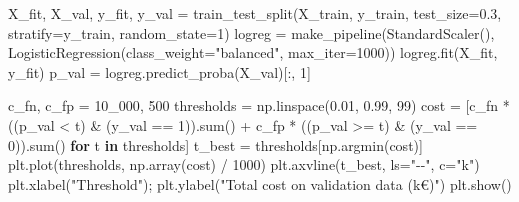 \documentclass[
  letterpaper,
  DIV=11,
  numbers=noendperiod]{scrreprt}
\newenvironment{Shaded}{\begin{snugshade}}{\end{snugshade}}
\newcommand{\BuiltInTok}[1]{\textcolor[rgb]{0.00,0.23,0.31}{#1}}
\newcommand{\ControlFlowTok}[1]{\textcolor[rgb]{0.00,0.23,0.31}{\textbf{#1}}}
\newcommand{\DecValTok}[1]{\textcolor[rgb]{0.68,0.00,0.00}{#1}}
\newcommand{\FloatTok}[1]{\textcolor[rgb]{0.68,0.00,0.00}{#1}}
\newcommand{\KeywordTok}[1]{\textcolor[rgb]{0.00,0.23,0.31}{\textbf{#1}}}
\newcommand{\NormalTok}[1]{\textcolor[rgb]{0.00,0.23,0.31}{#1}}
\newcommand{\OperatorTok}[1]{\textcolor[rgb]{0.37,0.37,0.37}{#1}}
\newcommand{\StringTok}[1]{\textcolor[rgb]{0.13,0.47,0.30}{#1}}
\begin{document}
\begin{tcolorbox}[enhanced jigsaw, left=2mm, title=\textcolor{quarto-callout-caution-color}{\faFire}\hspace{0.5em}{Solution to Exercise 2}, opacityback=0, breakable, rightrule=.15mm, arc=.35mm, toptitle=1mm, colbacktitle=quarto-callout-caution-color!10!white, opacitybacktitle=0.6, coltitle=black, colframe=quarto-callout-caution-color-frame, bottomrule=.15mm, leftrule=.75mm, bottomtitle=1mm, titlerule=0mm, toprule=.15mm, colback=white]

\begin{Shaded}
\begin{Highlighting}[]
\NormalTok{X\_fit, X\_val, y\_fit, y\_val }\OperatorTok{=}\NormalTok{ train\_test\_split(X\_train, y\_train, test\_size}\OperatorTok{=}\FloatTok{0.3}\NormalTok{,}
\NormalTok{                                              stratify}\OperatorTok{=}\NormalTok{y\_train, random\_state}\OperatorTok{=}\DecValTok{1}\NormalTok{)}
\NormalTok{logreg }\OperatorTok{=}\NormalTok{ make\_pipeline(StandardScaler(), LogisticRegression(class\_weight}\OperatorTok{=}\StringTok{"balanced"}\NormalTok{, max\_iter}\OperatorTok{=}\DecValTok{1000}\NormalTok{))}
\NormalTok{logreg.fit(X\_fit, y\_fit)}
\NormalTok{p\_val }\OperatorTok{=}\NormalTok{ logreg.predict\_proba(X\_val)[:, }\DecValTok{1}\NormalTok{]}

\NormalTok{c\_fn, c\_fp }\OperatorTok{=} \DecValTok{10\_000}\NormalTok{, }\DecValTok{500}
\NormalTok{thresholds }\OperatorTok{=}\NormalTok{ np.linspace(}\FloatTok{0.01}\NormalTok{, }\FloatTok{0.99}\NormalTok{, }\DecValTok{99}\NormalTok{)}
\NormalTok{cost }\OperatorTok{=}\NormalTok{ [c\_fn }\OperatorTok{*}\NormalTok{ ((p\_val }\OperatorTok{\textless{}}\NormalTok{ t) }\OperatorTok{\&}\NormalTok{ (y\_val }\OperatorTok{==} \DecValTok{1}\NormalTok{)).}\BuiltInTok{sum}\NormalTok{() }\OperatorTok{+}\NormalTok{ c\_fp }\OperatorTok{*}\NormalTok{ ((p\_val }\OperatorTok{\textgreater{}=}\NormalTok{ t) }\OperatorTok{\&}\NormalTok{ (y\_val }\OperatorTok{==} \DecValTok{0}\NormalTok{)).}\BuiltInTok{sum}\NormalTok{()}
        \ControlFlowTok{for}\NormalTok{ t }\KeywordTok{in}\NormalTok{ thresholds]}
\NormalTok{t\_best }\OperatorTok{=}\NormalTok{ thresholds[np.argmin(cost)]}
\NormalTok{plt.plot(thresholds, np.array(cost) }\OperatorTok{/} \DecValTok{1000}\NormalTok{)}
\NormalTok{plt.axvline(t\_best, ls}\OperatorTok{=}\StringTok{"{-}{-}"}\NormalTok{, c}\OperatorTok{=}\StringTok{"k"}\NormalTok{)}
\NormalTok{plt.xlabel(}\StringTok{"Threshold"}\NormalTok{)}\OperatorTok{;}\NormalTok{ plt.ylabel(}\StringTok{"Total cost on validation data (k€)"}\NormalTok{)}
\NormalTok{plt.show()}


\end{Highlighting}
\end{Shaded}
\end{tcolorbox}
\end{document}
